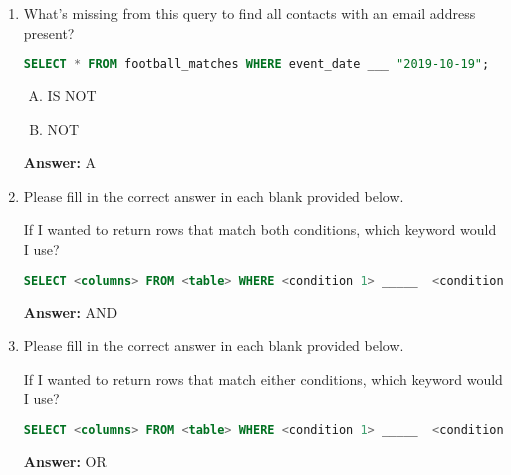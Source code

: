 \documentclass[12pt]{article}
\begin{document}
\begin{enumerate}[1.]
    \item

    What's missing from this query to find all contacts with an email address
    present?

    \bigskip

    \begin{lstlisting}[language=SQL]
    SELECT * FROM football_matches WHERE event_date ___ "2019-10-19";
    \end{lstlisting}

    \bigskip

    \begin{enumerate}[A.]
        \item IS NOT
        \item NOT
    \end{enumerate}

    \bigskip

    \textbf{Answer:} A

    \item

    Please fill in the correct answer in each blank provided below.

    \bigskip

    If I wanted to return rows that match both conditions, which keyword would I use?

    \bigskip

    \begin{lstlisting}[language=SQL]
    SELECT <columns> FROM <table> WHERE <condition 1> _____  <condition 2>;
    \end{lstlisting}

    \bigskip

    \textbf{Answer:} AND

    \item

    Please fill in the correct answer in each blank provided below.

    \bigskip

    If I wanted to return rows that match either conditions, which keyword would I use?

    \bigskip

    \begin{lstlisting}[language=SQL]
    SELECT <columns> FROM <table> WHERE <condition 1> _____  <condition 2>;
    \end{lstlisting}

    \bigskip

    \textbf{Answer:} OR


\end{enumerate}
\end{document}
